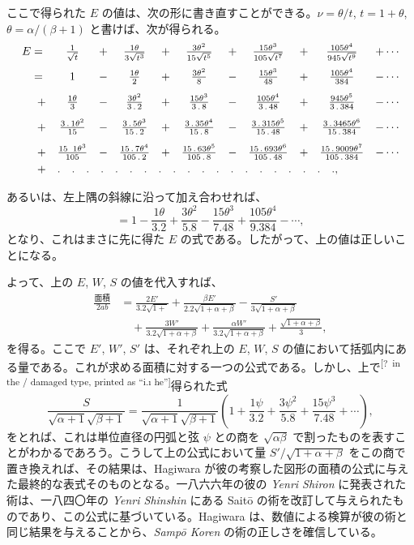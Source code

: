\documentclass[11pt]{article}
\newcommand{\scanpage}[2]{\clearpage\setcounter{footnote}{0}\noindent{\footnotesize\color{gray}PDF #1 頁 · #2}\par\medskip}
\newcommand{\unclear}[1]{\textsuperscript{[?~#1]}}
\begin{document}
ここで得られた $E$ の値は、次の形に書き直すことができる。$\nu = \theta/t$, $t = 1+\theta$, $\theta = \alpha/(\beta+1)$ と書けば、次が得られる。
\[
\begin{array}{rcccccccccl}
E ={} & \frac{1}{\sqrt{t}} & + & \frac{1\theta}{3\sqrt{t^3}} & + & \frac{3\theta^2}{15\sqrt{t^5}} & + & \frac{15\theta^3}{105\sqrt{t^7}} & + & \frac{105\theta^4}{945\sqrt{t^9}} & +\cdots\\[3mm]
={} & 1 & - & \frac{1\theta}{2} & + & \frac{3\theta^2}{8} & - & \frac{15\theta^3}{48} & + & \frac{105\theta^4}{384} & -\cdots\\[3mm]
+ & \frac{1\theta}{3} & - & \frac{3\theta^2}{3\,.\,2} & + & \frac{15\theta^3}{3\,.\,8} & - & \frac{105\theta^4}{3\,.\,48} & + & \frac{945\theta^5}{3\,.\,384} & -\cdots\\[3mm]
+ & \frac{3\,.\,1\theta^2}{15} & - & \frac{3\,.\,5\theta^3}{15\,.\,2} & + & \frac{3\,.\,35\theta^4}{15\,.\,8} & - & \frac{3\,.\,315\theta^5}{15\,.\,48} & + & \frac{3\,.\,3465\theta^6}{15\,.\,384} & -\cdots\\[3mm]
+ & \frac{15\;\;1\theta^3}{105} & - & \frac{15\,.\,7\theta^4}{105\,.\,2} & + & \frac{15\,.\,63\theta^5}{105\,.\,8} & - & \frac{15\,.\,693\theta^6}{105\,.\,48} & + & \frac{15\,.\,9009\theta^7}{105\,.\,384} & -\cdots\\[1mm]
+ & \multicolumn{10}{l}{.\quad.\quad.\quad.\quad.\quad.\quad.\quad.\quad.\quad.\quad.\quad.\quad.\quad.\quad.\quad.\quad.\quad.\quad.\quad.,}
\end{array}
\]

\scanpage{0336}{印刷頁 322}
あるいは、左上隅の斜線に沿って加え合わせれば、
\[
=1-\frac{1\theta}{3.2}+\frac{3\theta^2}{5.8}-\frac{15\theta^3}{7.48}+\frac{105\theta^4}{9.384}-\cdots,
\]
となり、これはまさに先に得た $E$ の式である。したがって、上の値は正しいことになる。

よって、上の $E$, $W$, $S$ の値を代入すれば、
\[
\begin{aligned}
\frac{\text{面積}}{2ab}&=\frac{2E'}{3.2\sqrt{1+}}+\frac{\beta E'}{2.2\sqrt{1+\alpha+\beta}}-\frac{S'}{3\sqrt{1+\alpha+\beta}}\\
&\quad+\frac{3W'}{3.2\sqrt{1+\alpha+\beta}}+\frac{\alpha W'}{3.2\sqrt{1+\alpha+\beta}}+\frac{\sqrt{1+\alpha+\beta}}{3},
\end{aligned}
\]
を得る。ここで $E'$, $W'$, $S'$ は、それぞれ上の $E$, $W$, $S$ の値において括弧内にある量である。これが求める面積に対する一つの公式である。しかし、上で\unclear{in the / damaged type, printed as ``i.ı he''}得られた式
\[
\frac{S}{\sqrt{\alpha+1}\sqrt{\beta+1}}=\frac{1}{\sqrt{\alpha+1}\sqrt{\beta+1}}\left(1+\frac{1\psi}{3.2}+\frac{3\psi^2}{5.8}+\frac{15\psi^3}{7.48}+\cdots\right),
\]
をとれば、これは単位直径の円弧と弦 $\psi$ との商を $\sqrt{\alpha\beta}$ で割ったものを表すことがわかるであろう。こうして上の公式において量 $S'/\sqrt{1+\alpha+\beta}$ をこの商で置き換えれば、その結果は、Hagiwara が彼の考察した図形の面積の公式に与えた最終的な表式そのものとなる。一八六六年の彼の \emph{Yenri Shiron} に発表された術は、一八四〇年の \emph{Yenri Shinshin} にある Saitō の術を改訂して与えられたものであり、この公式に基づいている。Hagiwara は、数値による検算が彼の術と同じ結果を与えることから、\emph{Sampō Koren} の術の正しさを確信している。
\end{document}
